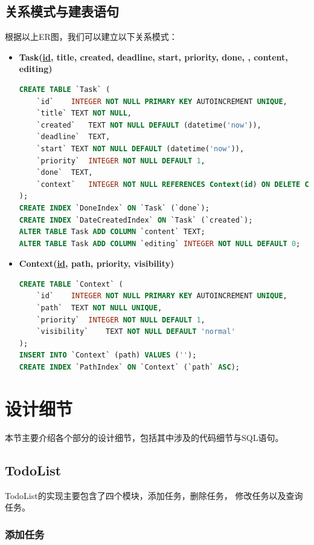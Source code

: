 \documentclass[logo,reportComp]{thesis}
\begin{document}
\subsection{关系模式与建表语句}

根据以上ER图，我们可以建立以下关系模式：
\begin{itemize}
\item \textbf{Task(\uline{id}, title, created, deadline, start, priority, done, , content, editing)}
\begin{lstlisting}[language=SQL]
CREATE TABLE `Task` (
	`id`	INTEGER NOT NULL PRIMARY KEY AUTOINCREMENT UNIQUE,
	`title`	TEXT NOT NULL,
	`created`	TEXT NOT NULL DEFAULT (datetime('now')),
	`deadline`	TEXT,
	`start`	TEXT NOT NULL DEFAULT (datetime('now')),
	`priority`	INTEGER NOT NULL DEFAULT 1,
	`done`	TEXT,
	`context`	INTEGER NOT NULL REFERENCES Context(id) ON DELETE CASCADE
);
CREATE INDEX `DoneIndex` ON `Task` (`done`);
CREATE INDEX `DateCreatedIndex` ON `Task` (`created`);
ALTER TABLE Task ADD COLUMN `content` TEXT;
ALTER TABLE Task ADD COLUMN `editing` INTEGER NOT NULL DEFAULT 0;
\end{lstlisting}
\item \textbf{Context(\uline{id}, path, priority, visibility)}
\begin{lstlisting}[language=SQL]
CREATE TABLE `Context` (
	`id`	INTEGER NOT NULL PRIMARY KEY AUTOINCREMENT UNIQUE,
	`path`	TEXT NOT NULL UNIQUE,
	`priority`	INTEGER NOT NULL DEFAULT 1,
	`visibility`	TEXT NOT NULL DEFAULT 'normal'
);
INSERT INTO `Context` (path) VALUES ('');
CREATE INDEX `PathIndex` ON `Context` (`path` ASC);
\end{lstlisting}
\end{itemize}

\section{设计细节}

本节主要介绍各个部分的设计细节，包括其中涉及的代码细节与SQL语句。

\subsection{TodoList}
TodoList的实现主要包含了四个模块，添加任务，删除任务， 修改任务以及查询任务。
\subsubsection{添加任务}
\end{document}
